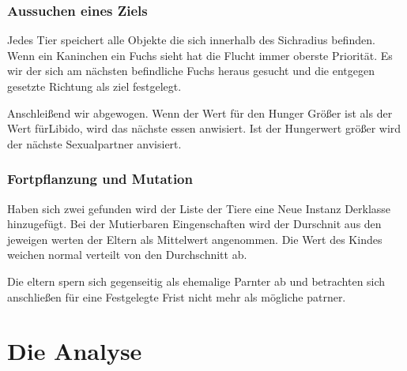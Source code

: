 \documentclass[12pt]{article}
\begin{document}
\subsubsection{Aussuchen eines Ziels}
Jedes Tier speichert alle Objekte die sich innerhalb des Sichradius befinden.
Wenn ein Kaninchen ein Fuchs sieht hat die Flucht immer oberste Priorität.
Es wir der sich am nächsten befindliche Fuchs heraus gesucht und die entgegen gesetzte Richtung als ziel festgelegt.

Anschleißend wir abgewogen.
Wenn der Wert für den Hunger Größer ist als der Wert fürLibido, wird das nächste essen anwisiert.
Ist der Hungerwert größer wird der nächste Sexualpartner anvisiert.
\subsubsection{Fortpflanzung und Mutation}
Haben sich zwei gefunden wird der Liste der Tiere eine Neue Instanz Derklasse hinzugefügt.
Bei der Mutierbaren Eingenschaften wird der Durschnit aus den jeweigen werten der Eltern als Mittelwert angenommen.
Die Wert des Kindes weichen normal verteilt von den Durchschnitt ab.

Die eltern spern sich gegenseitig als ehemalige Parnter ab und betrachten sich anschließen für eine Festgelegte Frist nicht mehr als mögliche patrner.


\section{Die Analyse}
\end{document}
